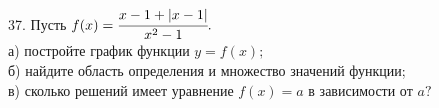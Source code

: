 37. Пусть $f(x)=\cfrac{x-1+|x-1|}{x^2-1}.$\\
а) постройте график функции $y=f(x);$\\
б) найдите область определения и множество значений функции;\\
в) сколько решений имеет уравнение $f(x)=a$ в зависимости от $a?$\\
